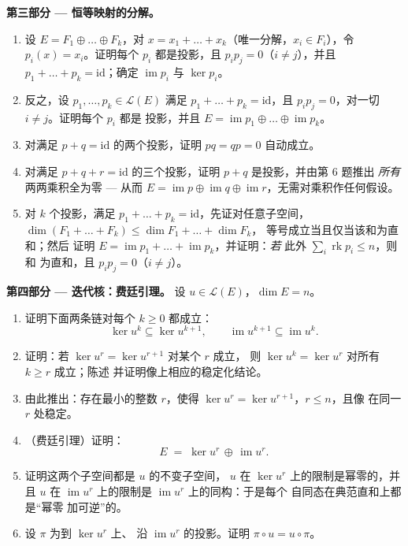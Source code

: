 \begin{problem}
\medskip
\noindent\textbf{第三部分 --- 恒等映射的分解。}
\begin{enumerate}[resume]
  \item 设 $E = F_1 \oplus \dots \oplus F_k$，对 $x = x_1 +
        \dots + x_k$（唯一分解，$x_i \in F_i$），令
        $p_i(x) = x_i$。证明每个 $p_i$ 都是投影，且
        $p_i p_j = 0$（$i \neq j$），并且 $p_1 + \dots + p_k
        = \mathrm{id}$；确定 $\operatorname{im} p_i$ 与
        $\ker p_i$。
  \item 反之，设 $p_1, \dots, p_k \in \mathcal{L}(E)$
        满足 $p_1 + \dots + p_k = \mathrm{id}$，且 $p_i p_j =
        0$，对一切 $i \neq j$。证明每个 $p_i$ 都是
        投影，并且 $E = \operatorname{im} p_1 \oplus
        \dots \oplus \operatorname{im} p_k$。
  \item 对满足 $p + q = \mathrm{id}$ 的两个投影，证明 $pq
        = qp = 0$ 自动成立。
  \item 对满足 $p + q + r = \mathrm{id}$ 的三个投影，证明
        $p + q$ 是投影，并由第 6 题推出
        \emph{所有}两两乘积全为零 --- 从而 $E =
        \operatorname{im} p \oplus \operatorname{im} q \oplus
        \operatorname{im} r$，无需对乘积作任何假设。
  \item 对 $k$ 个投影，满足 $p_1 + \dots + p_k =
        \mathrm{id}$，先证对任意子空间，$\dim
        (F_1 + \dots + F_k) \leq \dim F_1 + \dots + \dim F_k$，
        等号成立当且仅当该和为直和；然后
        证明 $E = \operatorname{im} p_1 + \dots +
        \operatorname{im} p_k$，并证明：\emph{若}
        此外 $\sum_i \operatorname{rk} p_i \leq n$，则和
        为直和，且 $p_i p_j = 0$（$i \neq j$）。
\end{enumerate}

\medskip
\noindent\textbf{第四部分 --- 迭代核：费廷引理。}
设 $u \in \mathcal{L}(E)$，$\dim E = n$。
\begin{enumerate}[resume]
  \item 证明下面两条链对每个 $k \geq 0$ 都成立：
        \[
        \ker u^k \subseteq \ker u^{k+1},
        \qquad
        \operatorname{im} u^{k+1} \subseteq \operatorname{im}
        u^k .
        \]
  \item 证明：若 $\ker u^{r} = \ker u^{r+1}$ 对某个 $r$ 成立，
        则 $\ker u^{k} = \ker u^{r}$ 对所有 $k \geq r$ 成立；陈述
        并证明像上相应的稳定化结论。
  \item 由此推出：存在最小的整数 $r$，使得 $\ker
        u^{r} = \ker u^{r+1}$，$r \leq n$，且像
        在同一 $r$ 处稳定。
  \item （费廷引理）证明：
        \[
        E \;=\; \ker u^{r} \,\oplus\, \operatorname{im} u^{r} .
        \]
  \item 证明这两个子空间都是 $u$ 的不变子空间，
        $u$ 在 $\ker u^{r}$ 上的限制是幂零的，并且
        $u$ 在 $\operatorname{im} u^{r}$ 上的限制是
        $\operatorname{im} u^{r}$ 上的同构：于是每个
        自同态在典范直和上都是“幂零
        加可逆”的。
  \item 设 $\pi$ 为到 $\ker u^{r}$ 上、
        沿 $\operatorname{im} u^{r}$ 的投影。证明 $\pi \circ u = u
        \circ \pi$。
\end{enumerate}


\end{problem}
